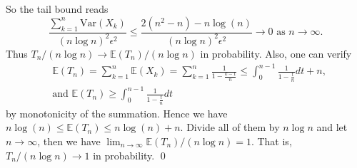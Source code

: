 \begin{answer}
\begin{equation*}
\end{equation*}
So the tail bound reads
\begin{equation*}
    \frac{\sum_{k=1}^n\text{Var}(X_k)}{(n\log n)^2\epsilon^2}\leq\frac{2(n^2-n)-n\log(n)}{(n\log n)^2\epsilon^2}\rightarrow 0\text{ as }n\rightarrow\infty.
\end{equation*}
Thus $T_n/(n\log n)\rightarrow\mathbb{E}(T_n)/(n\log n)$ in probability. Also, one can verify
\begin{equation*}
\begin{aligned}
    &\mathbb{E}(T_n)=\sum_{k=1}^n\mathbb{E}(X_k)=\sum_{k=1}^n\frac{1}{1-\frac{k-1}{n}}\leq\int_0^{n-1}\frac{1}{1-\frac{t}{n}}dt+n,\\
    &\text{and  }\mathbb{E}(T_n)\geq\int_0^{n-1}\frac{1}{1-\frac{t}{n}}dt
\end{aligned}
\end{equation*}
by monotonicity of the summation. Hence we have $n\log(n)\leq\mathbb{E}(T_n)\leq n\log(n)+n$. Divide all of them by $n\log n$ and let $n\rightarrow\infty$, then we have $\lim_{n\rightarrow\infty}\mathbb{E}(T_n)/(n\log n)=1$. That is, $T_n/(n\log n)\rightarrow 1$ in probability.
\qed\qquad
\end{answer}


